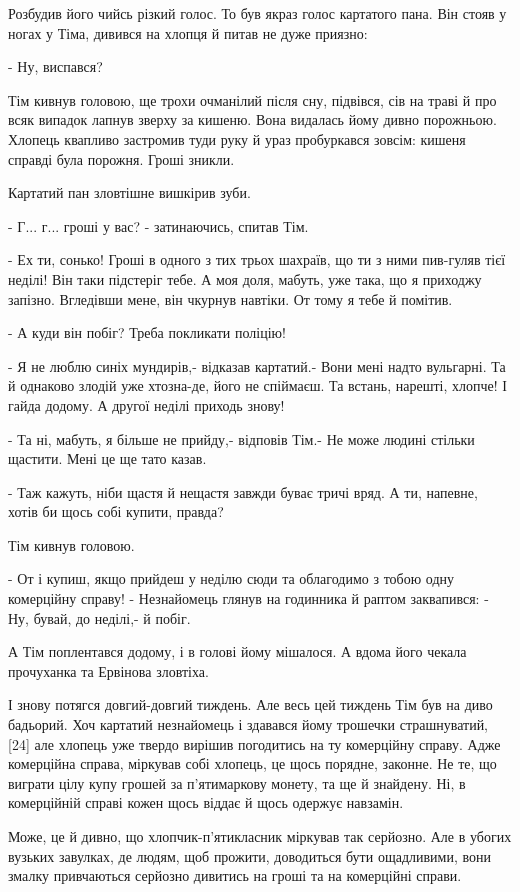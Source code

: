 Розбудив його чийсь різкий голос. То був якраз голос картатого пана. Він стояв у ногах у Тіма, дивився на хлопця й питав не дуже приязно:

- Ну, виспався?

Тім кивнув головою, ще трохи очманілий після сну, підвівся, сів на траві й про всяк випадок лапнув зверху за кишеню. Вона видалась йому дивно порожньою. Хлопець квапливо застромив туди руку й ураз пробуркався зовсім: кишеня справді була порожня. Гроші зникли.

Картатий пан зловтішне вишкірив зуби.

- Г... г... гроші у вас? - затинаючись, спитав Тім.

- Ех ти, сонько! Гроші в одного з тих трьох шахраїв, що ти з ними пив-гуляв тієї неділі! Він таки підстеріг тебе. А моя доля, мабуть, уже така, що я приходжу запізно. Вгледівши мене, він чкурнув навтіки. От тому я тебе й помітив.

- А куди він побіг? Треба покликати поліцію!

- Я не люблю синіх мундирів,- відказав картатий.- Вони мені надто вульгарні. Та й однаково злодій уже хтозна-де, його не спіймаєш. Та встань, нарешті, хлопче! І гайда додому. А другої неділі приходь знову!

- Та ні, мабуть, я більше не прийду,- відповів Тім.- Не може людині стільки щастити. Мені це ще тато казав.

- Таж кажуть, ніби щастя й нещастя завжди буває тричі вряд. А ти, напевне, хотів би щось собі купити, правда?

Тім кивнув головою.

- От і купиш, якщо прийдеш у неділю сюди та облагодимо з тобою одну комерційну справу! - Незнайомець глянув на годинника й раптом заквапився: - Ну, бувай, до неділі,- й побіг.

А Тім поплентався додому, і в голові йому мішалося. А вдома його чекала прочуханка та Ервінова зловтіха.

І знову потягся довгий-довгий тиждень. Але весь цей тиждень Тім був на диво бадьорий. Хоч картатий незнайомець і здавався йому трошечки страшнуватий, [24] але хлопець уже твердо вирішив погодитись на ту комерційну справу. Адже комерційна справа, міркував собі хлопець, це щось порядне, законне. Не те, що виграти цілу купу грошей за п'ятимаркову монету, та ще й знайдену. Ні, в комерційній справі кожен щось віддає й щось одержує навзамін.

Може, це й дивно, що хлопчик-п'ятикласник міркував так серйозно. Але в убогих вузьких завулках, де людям, щоб прожити, доводиться бути ощадливими, вони змалку привчаються серйозно дивитись на гроші та на комерційні справи.

